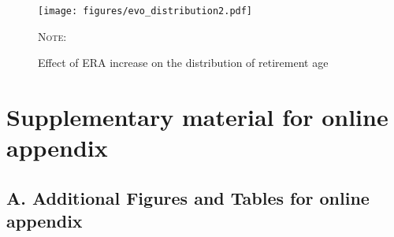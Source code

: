 \documentclass[12pt,a4paper]{article}
\begin{document}
\begin{figure}[p]
	\centering
	\begin{adjustwidth}{-0.5in}{-0.5in}
		\centering
		\caption{Effect of ERA increase on the distribution of retirement age}
		\label{evo_distribution_era}
		\texttt{[image: figures/evo\_distribution2.pdf]}
	\end{adjustwidth}
	
	\begin{minipage}{14cm}%
		\scriptsize
		\textsc{Note:} 
	\end{minipage}%
\end{figure}

\clearpage




\resetfootnote
\section*{Supplementary material for online appendix}\label{online_appendix}

\setcounter{table}{0}
\setcounter{equation}{0}
\setcounter{figure}{0}
\renewcommand{\thefigure}{A.\arabic{figure}}
\renewcommand{\thetable}{A.\arabic{table}}
\renewcommand{\theequation}{A.\arabic{equation}}


\subsection*{A. Additional Figures and Tables for online appendix}\label{appendix_new_plots_tables}
\end{document}

